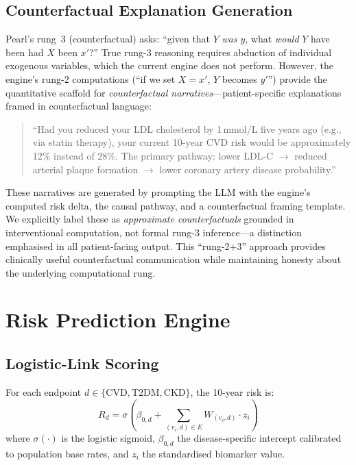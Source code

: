 \documentclass[runningheads]{llncs}
\begin{document}
\subsection{Counterfactual Explanation Generation}\label{sec:counterfactual}

Pearl's rung~3 (counterfactual) asks: ``given that $Y$ \emph{was}
$y$, what \emph{would} $Y$ have been had $X$ been $x'$?''
True rung-3 reasoning requires abduction of individual exogenous
variables, which the current engine does not perform.
However, the engine's rung-2 computations (``if we set $X = x'$,
$Y$ becomes $y'$'') provide the quantitative scaffold for
\emph{counterfactual narratives}---patient-specific explanations
framed in counterfactual language:

\begin{quote}
\small
``Had you reduced your LDL cholesterol by 1\,mmol/L five years ago
(e.g., via statin therapy), your current 10-year CVD risk would be
approximately 12\% instead of 28\%. The primary pathway: lower
LDL-C $\to$ reduced arterial plaque formation $\to$ lower
coronary artery disease probability.''
\end{quote}

These narratives are generated by prompting the LLM with the
engine's computed risk delta, the causal pathway, and a
counterfactual framing template.
We explicitly label these as \emph{approximate counterfactuals}
grounded in interventional computation, not formal rung-3
inference---a distinction emphasised in all patient-facing output.
This ``rung-2+3'' approach provides clinically useful
counterfactual communication while maintaining honesty about
the underlying computational rung.

\section{Risk Prediction Engine}\label{sec:risk}

\subsection{Logistic-Link Scoring}\label{sec:logistic}

For each endpoint $d \in \{\text{CVD}, \text{T2DM}, \text{CKD}\}$,
the 10-year risk is:
\begin{equation}\label{eq:risk}
R_d = \sigma\!\left(\beta_{0,d} + \sum_{(v_i, d) \in E} W_{(v_i,d)} \cdot z_i\right)
\end{equation}
where $\sigma(\cdot)$ is the logistic sigmoid, $\beta_{0,d}$ the
disease-specific intercept calibrated to population base rates, and
$z_i$ the standardised biomarker value.
\end{document}
